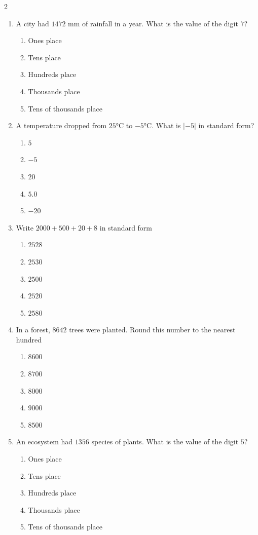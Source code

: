 \documentclass[10pt]{article}
\begin{document}
\begin{multicols}{2}
\begin{enumerate}[label=\textbf{Q\arabic*.}, leftmargin=*, itemsep=6pt, parsep=0pt]
  \item \small A city had $1472$ mm of rainfall in a year. What is the value of the digit $7$?
  \begin{enumerate}[label=(\Alph*), leftmargin=0.6cm, nosep, itemsep=2pt]
    \item Ones place
    \item Tens place
    \item Hundreds place
    \item Thousands place
    \item Tens of thousands place
  \end{enumerate}

  \item \small A temperature dropped from $25$°C to $-5$°C. What is $|-5|$ in standard form?
  \begin{enumerate}[label=(\Alph*), leftmargin=0.6cm, nosep, itemsep=2pt]
    \item $5$
    \item $-5$
    \item $20$
    \item $5.0$
    \item $-20$
  \end{enumerate}

  \item \small Write $2000 + 500 + 20 + 8$ in standard form
  \begin{enumerate}[label=(\Alph*), leftmargin=0.6cm, nosep, itemsep=2pt]
    \item $2528$
    \item $2530$
    \item $2500$
    \item $2520$
    \item $2580$
  \end{enumerate}

  \item \small In a forest, $8642$ trees were planted. Round this number to the nearest hundred
  \begin{enumerate}[label=(\Alph*), leftmargin=0.6cm, nosep, itemsep=2pt]
    \item $8600$
    \item $8700$
    \item $8000$
    \item $9000$
    \item $8500$
  \end{enumerate}

  \item \small An ecosystem had $1356$ species of plants. What is the value of the digit $5$?
  \begin{enumerate}[label=(\Alph*), leftmargin=0.6cm, nosep, itemsep=2pt]
    \item Ones place
    \item Tens place
    \item Hundreds place
    \item Thousands place
    \item Tens of thousands place
  \end{enumerate}


\end{enumerate}
\end{multicols}
\end{document}
